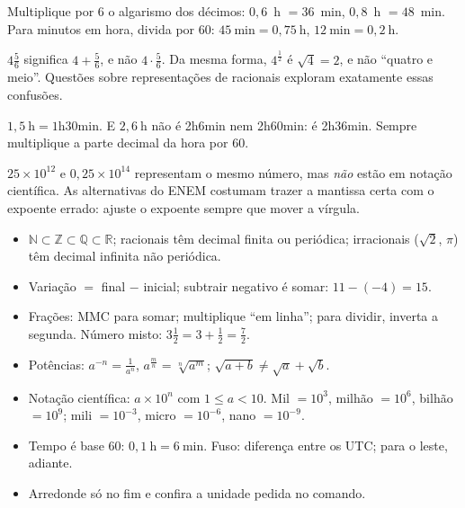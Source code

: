 \begin{macete}
Multiplique por 6 o algarismo dos décimos: $0,6$~h $=36$~min, $0,8$~h $=48$~min. Para minutos em
hora, divida por 60: $45~\text{min}=0,75~\text{h}$, $12~\text{min}=0,2~\text{h}$.
\end{macete}

\begin{atencao}
$4\frac{5}{6}$ significa $4+\frac{5}{6}$, e não $4\cdot\frac{5}{6}$. Da mesma forma, $4^{\frac{1}{2}}$
é $\sqrt{4}=2$, e não ``quatro e meio''. Questões sobre representações de racionais exploram
exatamente essas confusões.
\end{atencao}

\begin{atencao}
$1,5~\text{h}=1\text{h}30\text{min}$. E $2,6~\text{h}$ não é 2h6min nem 2h60min: é 2h36min. Sempre
multiplique a parte decimal da hora por 60.
\end{atencao}

\begin{atencao}
$25\times 10^{12}$ e $0,25\times 10^{14}$ representam o mesmo número, mas \emph{não} estão em notação
científica. As alternativas do ENEM costumam trazer a mantissa certa com o expoente errado:
ajuste o expoente sempre que mover a vírgula.
\end{atencao}

\begin{resumo}
\begin{itemize}[leftmargin=1.2em,itemsep=2pt]
  \item $\mathbb{N}\subset\mathbb{Z}\subset\mathbb{Q}\subset\mathbb{R}$; racionais têm decimal finita
        ou periódica; irracionais ($\sqrt{2}$, $\pi$) têm decimal infinita não periódica.
  \item Variação $=$ final $-$ inicial; subtrair negativo é somar: $11-(-4)=15$.
  \item Frações: MMC para somar; multiplique ``em linha''; para dividir, inverta a segunda.
        Número misto: $3\frac{1}{2}=3+\frac{1}{2}=\frac{7}{2}$.
  \item Potências: $a^{-n}=\frac{1}{a^n}$, $a^{\frac{m}{n}}=\sqrt[n]{a^m}$; $\sqrt{a+b}\neq\sqrt{a}+\sqrt{b}$.
  \item Notação científica: $a\times 10^n$ com $1\le a<10$. Mil $=10^3$, milhão $=10^6$, bilhão $=10^9$;
        mili $=10^{-3}$, micro $=10^{-6}$, nano $=10^{-9}$.
  \item Tempo é base 60: $0,1~\text{h}=6~\text{min}$. Fuso: diferença entre os UTC; para o leste, adiante.
  \item Arredonde só no fim e confira a unidade pedida no comando.
\end{itemize}
\end{resumo}

